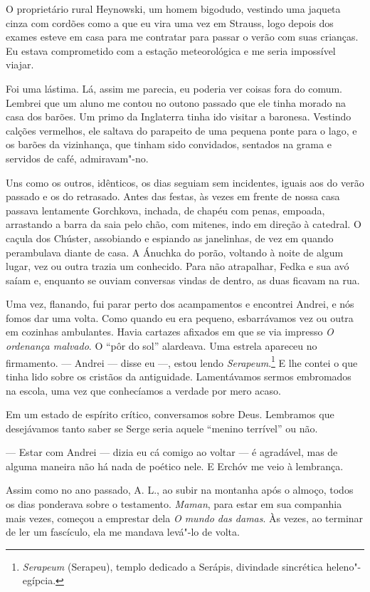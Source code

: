 O proprietário rural Heynowski, um homem bigodudo, vestindo uma jaqueta
cinza com cordões como a que eu vira uma vez em Strauss, logo depois dos
exames esteve em casa para me contratar para passar o verão com suas
crianças. Eu estava comprometido com a estação meteorológica e me seria
impossível viajar.

Foi uma lástima. Lá, assim me parecia, eu poderia ver coisas fora do
comum. Lembrei que um aluno me contou no outono passado que ele tinha
morado na casa dos barões. Um primo da Inglaterra tinha ido visitar a
baronesa. Vestindo calções vermelhos, ele saltava do parapeito de uma
pequena ponte para o lago, e os barões da vizinhança, que tinham sido
convidados, sentados na grama e servidos de café, admiravam"-no.

Uns como os outros, idênticos, os dias seguiam sem incidentes, iguais
aos do verão passado e os do retrasado. Antes das festas, às vezes em
frente de nossa casa passava lentamente Gorchkova, inchada, de chapéu
com penas, empoada, arrastando a barra da saia pelo chão, com mitenes,
indo em direção à catedral. O caçula dos Chúster, assobiando e espiando
as janelinhas, de vez em quando perambulava diante de casa. A Ánuchka do
porão, voltando à noite de algum lugar, vez ou outra trazia um
conhecido. Para não atrapalhar, Fedka e sua avó saíam e, enquanto se
ouviam conversas vindas de dentro, as duas ficavam na rua.

Uma vez, flanando, fui parar perto dos acampamentos e encontrei Andrei,
e nós fomos dar uma volta. Como quando eu era pequeno, esbarrávamos vez
ou outra em cozinhas ambulantes. Havia cartazes afixados em que se via
impresso \emph{O ordenança malvado}. O ``pôr do sol'' alardeava. Uma
estrela apareceu no firmamento. --- Andrei --- disse eu ---, estou lendo
\emph{Serapeum}.\footnote{\emph{Serapeum} (Serapeu), templo dedicado a
  Serápis, divindade sincrética heleno"-egípcia.} E lhe contei o que
tinha lido sobre os cristãos da antiguidade. Lamentávamos sermos
embromados na escola, uma vez que conhecíamos a verdade por mero acaso.

Em um estado de espírito crítico, conversamos sobre Deus. Lembramos que
desejávamos tanto saber se Serge seria aquele ``menino terrível'' ou
não.

--- Estar com Andrei --- dizia eu cá comigo ao voltar --- é agradável,
mas de alguma maneira não há nada de poético nele. E Erchóv me veio à
lembrança.

Assim como no ano passado, A. L., ao subir na montanha após o almoço,
todos os dias ponderava sobre o testamento. \emph{Maman}, para estar em
sua companhia mais vezes, começou a emprestar dela \emph{O mundo das
damas}. Às vezes, ao terminar de ler um fascículo, ela me mandava
levá"-lo de volta.

